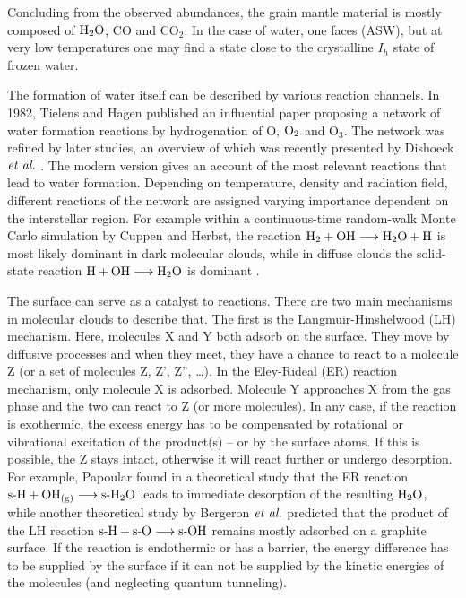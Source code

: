 \documentclass[8.5pt,twoside,twocolumn]{article}
\newcommand\sur{\enmat{\te{s-}}}
\newcommand\gas{\enmat{_\te{(g)}}}
\theoremstyle{standard}
\begin{document}
Concluding from the observed abundances, the grain mantle material is mostly
composed of $\text H _2 \text O$, CO and CO$_2$.
In the case of water, one faces  (ASW), but at very
low temperatures one may find a state close to the crystalline $I_h$ state of
frozen water.  

The formation of water itself can be described by various reaction channels. In
1982, Tielens and Hagen \cite{TielensHagen1982} published an influential paper
proposing a network of water formation reactions by hydrogenation of O, $\text O_2$
and O$_3$. The network was refined by later studies, an overview of which was
recently presented by Dishoeck $\emph{et al.}$ \cite{DishoeckHerbstNeufeld2013}.
The modern version gives an account of the most relevant reactions that lead to
water formation. Depending on temperature, density and radiation field,
different reactions of the network are assigned varying importance dependent on the
interstellar region. For example within a continuous-time random-walk Monte
Carlo simulation by Cuppen and Herbst, the reaction
\mbox{$\text H_2+\text O \text H\longrightarrow\text H _2 \text O+\text H$} is most likely dominant in dark molecular
clouds, while in diffuse clouds the solid-state reaction \mbox{$\text
H+\text O \text H\longrightarrow\text H _2 \text O$} is dominant \cite{CuppenHerbst2007}.

The surface can serve as a catalyst to reactions. There are two main mechanisms
in molecular clouds to describe that. The first is the Langmuir-Hinshelwood (LH)
\cite{LangmuirHinshelwood} mechanism. Here, molecules X and Y both adsorb on the surface. They
move by diffusive processes and when they meet, they have a chance to react to a
molecule Z (or a set of molecules Z, Z', Z'', \ldots).
In the Eley-Rideal (ER)\cite{Laidler1996} reaction mechanism, only molecule X is
adsorbed.
Molecule Y approaches X from the gas phase and the two can react to Z (or more
molecules). In any case, if the reaction is exothermic, the excess energy has
to be compensated by rotational or vibrational excitation of the product(s) --
or by the surface atoms.
If this is possible, the Z stays intact, otherwise it will react further or
undergo desorption. For example, Papoular \cite{Papoular2005} found in a
theoretical study that the ER reaction $\sur{\te H}+{\ho}\gas\chemar\sur{\hto}$
leads to immediate desorption of the resulting $\text H _2 \text O$, while another theoretical
study by Bergeron $\emph{et al.}$ predicted that the product of the LH reaction 
$\sur{\te H}+\sur{\te O}\chemar\sur{\ho}$ remains mostly adsorbed on a graphite
surface\cite{BergeronRougeauSidisEtAl2008}.
If the reaction is endothermic or has a barrier, the energy difference has to
be supplied by the surface if it can not be supplied by the kinetic energies of
the molecules (and neglecting quantum tunneling).
\end{document}
